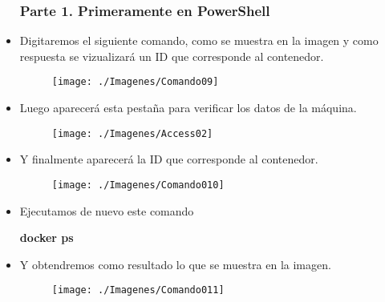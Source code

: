 \begin{itemize}
				\subsubsection{Parte 1. Primeramente en PowerShell}
					\item Digitaremos el siguiente comando, como se muestra en la imagen y como respuesta se vizualizará un ID que corresponde al contenedor.
						\begin{figure}[htb]
							\begin{center}
								\texttt{[image: ./Imagenes/Comando09]}
							\end{center}
						\end{figure}
					\item Luego aparecerá esta pestaña para verificar los datos de la máquina.
						\begin{figure}[htb]
							\begin{center}
								\texttt{[image: ./Imagenes/Access02]}
							\end{center}
						\end{figure}
					\item Y finalmente aparecerá la ID que corresponde al contenedor.
						\begin{figure}[htb]
							\begin{center}
								\texttt{[image: ./Imagenes/Comando010]}
							\end{center}
						\end{figure}
						\vspace{3cm}
					\item Ejecutamos de nuevo este comando 
						\begin{center}
							\textbf{docker ps} \\
						\end{center}
					\item Y obtendremos como resultado lo que se muestra en la imagen.
						\begin{figure}[htb]
							\begin{center}
								\texttt{[image: ./Imagenes/Comando011]}
							\end{center}
						\end{figure}

\end{itemize}

